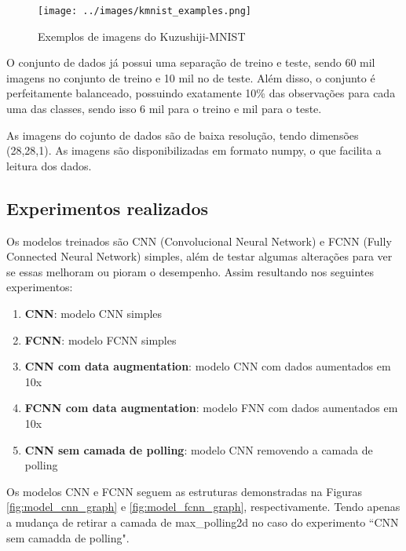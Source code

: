 \documentclass[12pt]{article}
\begin{document}
\begin{figure}[ht]
  \centering
  \texttt{[image: ../images/kmnist\_examples.png]}
  \caption{Exemplos de imagens do Kuzushiji-MNIST}
  \label{fig:kmnist-examples}
\end{figure}

O conjunto de dados já possui uma separação de treino e teste, sendo 60 mil imagens no conjunto de treino e 10 mil no de teste. Além disso, o conjunto é perfeitamente balanceado, possuindo exatamente 10\% das observações para cada uma das classes, sendo isso 6 mil para o treino e mil para o teste.

As imagens do cojunto de dados são de baixa resolução, tendo dimensões (28,28,1). As imagens são disponibilizadas em formato numpy, o que facilita a leitura dos dados.


\subsection{Experimentos realizados}


Os modelos treinados são CNN (Convolucional Neural Network) e FCNN (Fully Connected Neural Network) simples, além de testar algumas alterações para ver se essas melhoram ou pioram o desempenho. Assim resultando nos seguintes experimentos:

\begin{enumerate}
  \item \textbf{CNN}: modelo CNN simples
  \item \textbf{FCNN}: modelo FCNN simples 
  \item \textbf{CNN com data augmentation}: modelo CNN com dados aumentados em 10x
  \item \textbf{FCNN com data augmentation}: modelo FNN com dados aumentados em 10x
  \item \textbf{CNN sem camada de polling}: modelo CNN removendo a camada de polling
\end{enumerate}

Os modelos CNN e FCNN seguem as estruturas demonstradas na Figuras \ref{fig:model_cnn_graph} e \ref{fig:model_fcnn_graph}, respectivamente. Tendo apenas a mudança de retirar a camada de max\_polling2d no caso do experimento ``CNN sem camadda de polling".
\end{document}
